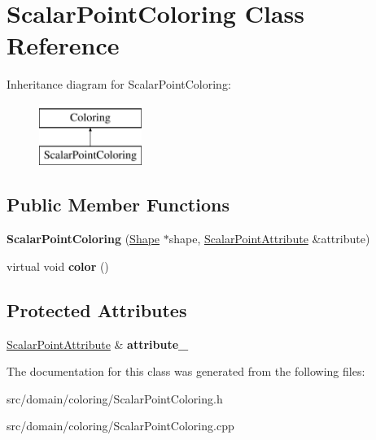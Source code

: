 \hypertarget{class_scalar_point_coloring}{}\section{Scalar\+Point\+Coloring Class Reference}
\label{class_scalar_point_coloring}
Inheritance diagram for Scalar\+Point\+Coloring\+:\begin{figure}[H]
\begin{center}
\leavevmode
\includegraphics[height=2.000000cm]{class_scalar_point_coloring}
\end{center}
\end{figure}
\subsection*{Public Member Functions}
\begin{DoxyCompactItemize}
\item 
\hypertarget{class_scalar_point_coloring_adfcc6a0275934074de3bdb04e2746a63}{}{\bfseries Scalar\+Point\+Coloring} (\hyperlink{class_shape}{Shape} $\ast$shape, \hyperlink{class_scalar_point_attribute}{Scalar\+Point\+Attribute} \&attribute)\label{class_scalar_point_coloring_adfcc6a0275934074de3bdb04e2746a63}

\item 
\hypertarget{class_scalar_point_coloring_aa16e206d19a206b60e64eeda8ce9d0d6}{}virtual void {\bfseries color} ()\label{class_scalar_point_coloring_aa16e206d19a206b60e64eeda8ce9d0d6}

\end{DoxyCompactItemize}
\subsection*{Protected Attributes}
\begin{DoxyCompactItemize}
\item 
\hypertarget{class_scalar_point_coloring_a8dd1c82ee24fa28ed30ddc6908210b57}{}\hyperlink{class_scalar_point_attribute}{Scalar\+Point\+Attribute} \& {\bfseries attribute\+\_\+}\label{class_scalar_point_coloring_a8dd1c82ee24fa28ed30ddc6908210b57}

\end{DoxyCompactItemize}


The documentation for this class was generated from the following files\+:\begin{DoxyCompactItemize}
\item 
src/domain/coloring/Scalar\+Point\+Coloring.\+h\item 
src/domain/coloring/Scalar\+Point\+Coloring.\+cpp\end{DoxyCompactItemize}
